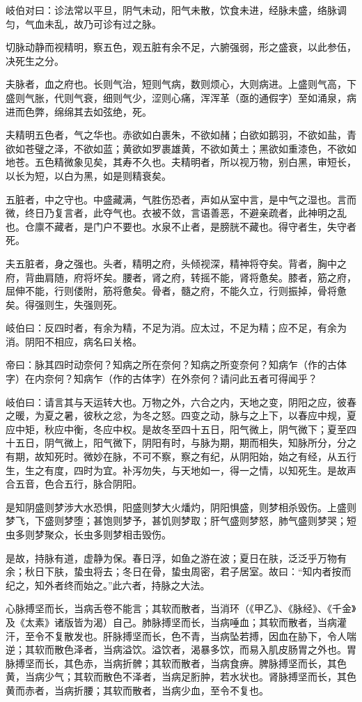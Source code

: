 \documentclass{article}%
\begin{document}
岐伯对曰：诊法常以平旦，阴气未动，阳气未散，饮食未进，经脉未盛，络脉调匀，气血未乱，故乃可诊有过之脉。

切脉动静而视精明，察五色，观五脏有余不足，六腑强弱，形之盛衰，以此参伍，决死生之分。

夫脉者，血之府也。长则气治，短则气病，数则烦心，大则病进。上盛则气高，下盛则气胀，代则气衰，细则气少，涩则心痛，浑浑革（亟的通假字）至如涌泉，病进而色弊，绵绵其去如弦绝，死。

夫精明五色者，气之华也。赤欲如白裹朱，不欲如赭；白欲如鹅羽，不欲如盐，青欲如苍璧之泽，不欲如蓝；黄欲如罗裹雄黄，不欲如黄土；黑欲如重漆色，不欲如地苍。五色精微象见矣，其寿不久也。夫精明者，所以视万物，别白黑，审短长，以长为短，以白为黑，如是则精衰矣。

五脏者，中之守也。中盛藏满，气胜伤恐者，声如从室中言，是中气之湿也。言而微，终日乃复言者，此夺气也。衣被不敛，言语善恶，不避亲疏者，此神明之乱也。仓廪不藏者，是门户不要也。水泉不止者，是膀胱不藏也。得守者生，失守者死。

夫五脏者，身之强也。头者，精明之府，头倾视深，精神将夺矣。背者，胸中之府，背曲肩随，府将坏矣。腰者，肾之府，转摇不能，肾将惫矣。膝者，筋之府，屈伸不能，行则偻附，筋将惫矣。骨者，髓之府，不能久立，行则振掉，骨将惫矣。得强则生，失强则死。

岐伯曰：反四时者，有余为精，不足为消。应太过，不足为精；应不足，有余为消。阴阳不相应，病名曰关格。

帝曰：脉其四时动奈何？知病之所在奈何？知病之所变奈何？知病乍（作的古体字）在内奈何？知病乍（作的古体字）在外奈何？请问此五者可得闻乎？

岐伯曰：请言其与天运转大也。万物之外，六合之内，天地之变，阴阳之应，彼春之暖，为夏之暑，彼秋之忿，为冬之怒。四变之动，脉与之上下，以春应中规，夏应中矩，秋应中衡，冬应中权。是故冬至四十五日，阳气微上，阴气微下；夏至四十五日，阴气微上，阳气微下，阴阳有时，与脉为期，期而相失，知脉所分，分之有期，故知死时。微妙在脉，不可不察，察之有纪，从阴阳始，始之有经，从五行生，生之有度，四时为宜。补泻勿失，与天地如一，得一之情，以知死生。是故声合五音，色合五行，脉合阴阳。

是知阴盛则梦涉大水恐惧，阳盛则梦大火燔灼，阴阳惧盛，则梦相杀毁伤。上盛则梦飞，下盛则梦堕；甚饱则梦予，甚饥则梦取；肝气盛则梦怒，肺气盛则梦哭；短虫多则梦聚众，长虫多则梦相击毁伤。

是故，持脉有道，虚静为保。春日浮，如鱼之游在波；夏日在肤，泛泛乎万物有余；秋日下肤，蛰虫将去；冬日在骨，蛰虫周密，君子居室。故曰：“知内者按而纪之，知外者终而始之。”此六者，持脉之大法。

心脉搏坚而长，当病舌卷不能言；其软而散者，当消环（《甲乙》、《脉经》、《千金》及《太素》诸版皆为渴）自己。肺脉搏坚而长，当病唾血；其软而散者，当病灌汗，至令不复散发也。肝脉搏坚而长，色不青，当病坠若搏，因血在胁下，令人喘逆；其软而散色泽者，当病溢饮。溢饮者，渴暴多饮，而易入肌皮肠胃之外也。胃脉搏坚而长，其色赤，当病折髀；其软而散者，当病食痹。脾脉搏坚而长，其色黄，当病少气；其软而散色不泽者，当病足胻肿，若水状也。肾脉搏坚而长，其色黄而赤者，当病折腰；其软而散者，当病少血，至令不复也。
\end{document}
